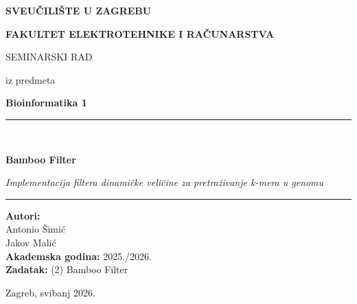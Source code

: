 \documentclass[12pt,a4paper]{article}
\begin{document}
\begin{titlepage}
    \centering
    \vspace*{1cm}

    {\large\bfseries SVEUČILIŠTE U ZAGREBU\par}
    {\large\bfseries FAKULTET ELEKTROTEHNIKE I RAČUNARSTVA\par}

    \vspace{3cm}

    {\large SEMINARSKI RAD\par}
    {\large iz predmeta\par}
    {\large\bfseries Bioinformatika 1\par}

    \vspace{2cm}

    \rule{\linewidth}{0.5mm}\\[0.5cm]
    {\Huge\bfseries Bamboo Filter\par}
    \vspace{0.4cm}
    {\large\itshape Implementacija filtera dinamičke veličine za pretraživanje k-mera u genomu\par}
    \rule{\linewidth}{0.5mm}

    \vspace{3cm}

    \begin{flushleft}
    \large\textbf{Autori:}\\[0.3cm]
    \large Antonio Šimić\\
    \large Jakov Malić\\[1cm]
    \large\textbf{Akademska godina:} 2025./2026.\\[0.3cm]
    \large\textbf{Zadatak:} (2) Bamboo Filter \cite{wang2022bamboo,wang2024bamboo}
    \end{flushleft}

    \vfill
    {\large Zagreb, svibanj 2026.\par}
\end{titlepage}


\thispagestyle{empty}
\end{document}
